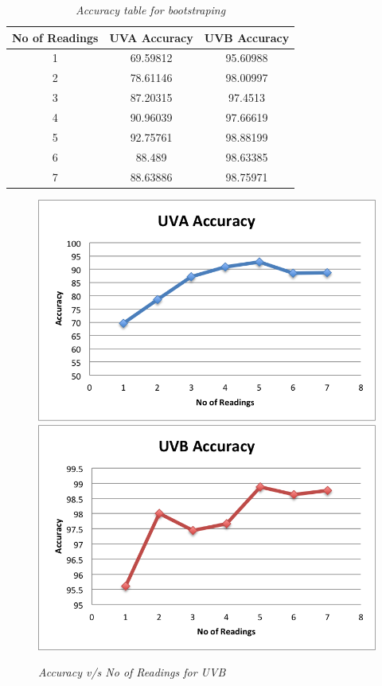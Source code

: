 \documentclass[12pt,fullpage,doublespace]{article}
\begin{document}
\newpage
\begin{table}
\centering
\begin{tabular}{|c|c|c|}
\hline
No of Readings & UVA Accuracy & UVB Accuracy \\
\hline 
1 & 69.59812 & 95.60988\\
\hline
2 & 78.61146 & 98.00997\\
\hline
3 & 87.20315 & 97.4513\\
\hline
4 & 90.96039 & 97.66619\\
\hline
5 & 92.75761 & 98.88199\\
\hline
6 & 88.489 & 98.63385\\
\hline
7 & 88.63886 & 98.75971\\
\hline
\end{tabular}
\caption{\small \sl Accuracy table for bootstraping}
\end{table}


\begin{figure}
\begin{center}
\includegraphics[scale=0.5]{segment5uva.png}
\includegraphics[scale=0.5]{segment5uvb.png}
\caption{\small \sl Accuracy v/s No of Readings for UVB}
\label{fig:lessReadings}
\end{center}
\end{figure}
\end{document}
